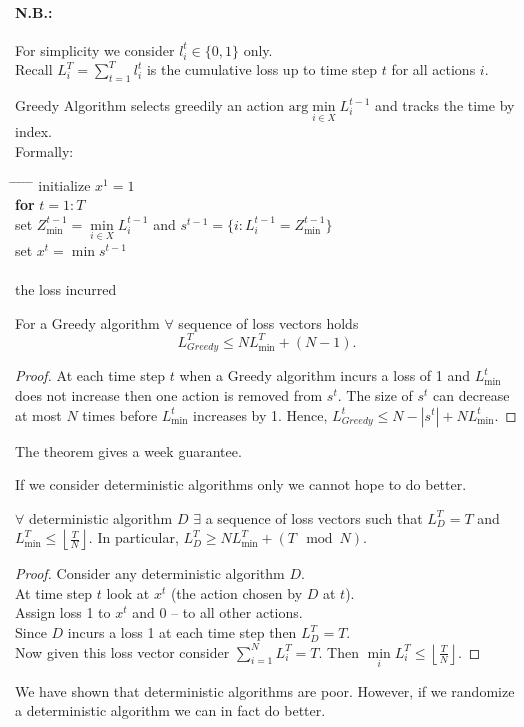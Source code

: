 \paragraph{N.B.:}For simplicity we consider $l^t_i\in\{0,1\}$ only.\\
Recall $L^T_i=\sum\limits_{t=1}^T l^t_i$ is the cumulative loss up to time step $t$ for all actions $i$.
\begin{definition}
Greedy Algorithm selects greedily an action $\text{arg}\min\limits_{i\in X}L^{t-1}_i$ and tracks the time by index.\\
Formally:
\begin{tabbing}
\hspace*{.25in} \= \hspace*{.25in} \= \hspace*{.25in} \= \hspace*{.25in} \= \hspace*{.25in} \=\kill
\> initialize $x^1=1$\\
\> {\bf for} $t=1:T$\\
\>\> set $Z^{t-1}_{\min}=\min\limits_{i\in X}L^{t-1}_i$ and $s^{t-1}=\{i:L^{t-1}_i=Z^{t-1}_{\min}\}$\\
\>\> set $x^t=\min s^{t-1}$\\
 \\
 the loss incurred
\end{tabbing}
\end{definition}
\begin{theorem}
For a Greedy algorithm $\forall$ sequence of loss vectors holds
$$
L^T_{Greedy}\leq NL^T_{\min}+(N-1).
$$
\end{theorem} 
\begin{proof}
At each time step $t$  when a Greedy algorithm incurs a loss of 1 and $L^t_{\min}$ does not increase then one action is removed from $s^t$. The size of $s^t$ can decrease at most $N$ times before $L^t_{\min}$ increases by 1. Hence, $L^t_{Greedy}\leq N-|s^t|+NL^t_{\min}$.
\end{proof}
The theorem gives a week guarantee.

If we consider deterministic algorithms only we cannot hope to do better.
\begin{theorem}
$\forall$ deterministic algorithm $D$ $\exists$ a sequence of loss vectors such that $L^T_D=T$ and $L^T_{\min}\leq\left\lfloor\frac{T}{N}\right\rfloor$. In particular, $L^T_D\geq NL^T_{\min}+(T\mod N)$.
\end{theorem}
\begin{proof}
Consider any deterministic algorithm $D$.\\
At time step $t$ look at $x^t$ (the action chosen by $D$ at $t$).\\
Assign loss 1 to $x^t$ and 0 -- to all other actions.\\
Since $D$ incurs a loss 1 at each time step then $L^T_D=T$.\\
Now given this loss vector consider $\sum\limits_{i=1}^NL^T_i=T$. Then $\min\limits_i L^T_i\leq\left\lfloor\frac{T}{N}\right\rfloor$.
\end{proof}
We have shown that deterministic algorithms are poor. However, if we randomize a deterministic algorithm we can in fact do better.\\
